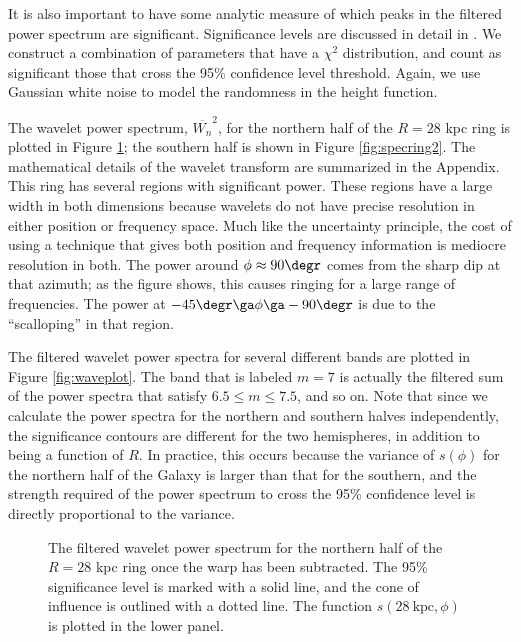 \documentclass[apj]{emulateapj}
\begin{document}
It is also important to have some analytic measure of which peaks in the filtered power spectrum  are significant. Significance levels are discussed in detail in \citet{TC1998}. We construct a combination of parameters that have a $\chi^2$ distribution, and count as significant those that cross the 95\% confidence level threshold.
Again, we use Gaussian white noise to model the randomness in the height function. 

The wavelet power spectrum, $\overline{W_n}^2$, for the northern half of the $R=28$ kpc ring is plotted in Figure \ref{fig:specring}; the southern half is shown in Figure \ref{fig:specring2}. The mathematical details of the wavelet transform are summarized in the Appendix.
This ring has several regions with significant power. These regions have a large width in both dimensions because wavelets do not have precise resolution in either position or frequency space. Much like the uncertainty principle, the cost of using a technique that gives both position and frequency information is mediocre resolution in both.  The power around $\phi\approx90\degr$ comes from the sharp dip at that azimuth; as the figure shows, this causes ringing for a large range of frequencies. The power at $-45\degr\ga\phi\ga-90\degr$ is due to the ``scalloping'' in that region. 

The filtered wavelet power spectra for several different bands are plotted in Figure \ref{fig:waveplot}. The band that is labeled $m=7$ is actually the filtered sum of the power spectra that satisfy $6.5\le m \le 7.5$, and so on.  Note that since we calculate the power spectra for the northern and southern halves independently, the significance contours are different for the two hemispheres, in addition to being a function of $R$. In practice, this occurs because the variance of $s(\phi)$ for the northern half of the Galaxy is larger than that for the southern, and the strength required of the power spectrum  to cross the 95\% confidence level is directly proportional to the variance.



\begin{figure}
\caption{\label{fig:specring}The filtered wavelet power spectrum for the northern half of the $R=28$ kpc ring once the warp has been subtracted. The 95\% significance level is marked with a solid line, and the cone of influence is outlined with a dotted line. The function $s(28~\mathrm{kpc},\phi)$ is plotted in the lower panel.}
\end{figure}
\end{document}
